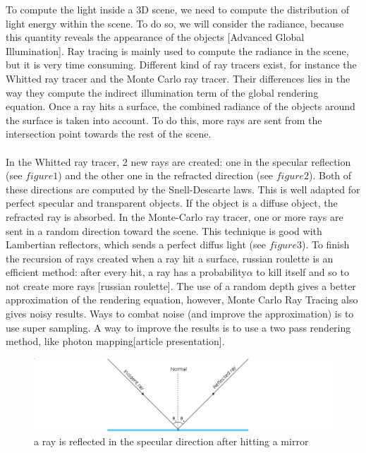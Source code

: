 \documentclass[12pt]{article}
\numberwithin{equation}{section}
\begin{document}
To compute the light inside a 3D scene, we need to compute the distribution of light energy within the scene. To do so, we will consider the radiance, because this quantity reveals the appearance of the objects [Advanced Global Illumination]. Ray tracing is mainly used to compute the radiance in the scene, but it is very time consuming. Different kind of ray tracers exist, for instance the Whitted ray tracer and the Monte Carlo ray tracer. Their differences lies in the way they compute the indirect illumination term of the global rendering equation. Once a ray hits a surface, the combined radiance of the objects around the surface is taken into account. To do this, more rays are sent from the intersection point towards the rest of the scene.\\
\\
In the Whitted ray tracer, 2 new rays are created: one in the specular reflection (see $figure 1$) and the other one in the refracted direction (see $figure 2$). Both of these directions are computed by the Snell-Descarte laws. This is well adapted for perfect specular and transparent objects. If the object is a diffuse object, the refracted ray is absorbed.
In the Monte-Carlo ray tracer, one or more rays are sent in a random direction toward the scene. This technique is good with Lambertian reflectors, which sends a perfect diffus light (see $figure 3$). To finish the recursion of rays created when a ray hit a surface, russian roulette is an efficient method: after every hit, a ray has a probability$\alpha$ to kill itself and so to not create more rays [russian roulette]. The use of a random depth gives a better approximation of the rendering equation, however, Monte Carlo Ray Tracing also gives noisy results. Ways to combat noise (and improve the approximation) is to use super sampling. A way to improve the results is to use a two pass rendering method, like photon mapping[article presentation].\\

\begin{figure}
  \begin{center}
    \includegraphics[scale=0.6]{425px-ray_optics_diagram_incidence_reflection_and_refraction_svg_wide.png}
    \caption{a ray is reflected in the specular direction after hitting a mirror}
    \label{fig:1}
  \end{center}
\end{figure}
\end{document}
